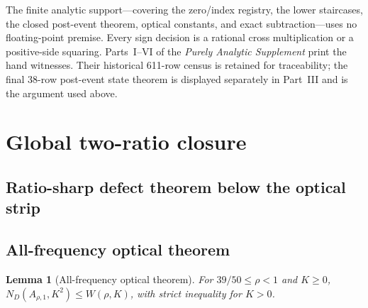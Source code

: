 \documentclass[11pt]{article}
\numberwithin{equation}{section}
\newtheorem{lemma}[theorem]{Lemma}
\theoremstyle{definition}
\theoremstyle{remark}
\begin{document}
The finite analytic support---covering the zero/index registry, the lower
staircases, the closed post-event theorem, optical constants, and exact
subtraction---uses no floating-point premise.  Every sign decision is a
rational cross multiplication or a positive-side squaring.  Parts~I--VI of
the \emph{Purely Analytic Supplement} print the hand witnesses.  Their
historical 611-row census is retained for traceability; the final
38-row post-event state theorem is displayed separately in Part~III and is
the argument used above.

\fi

\section{Global two-ratio closure}
\label{sec:global-two-owner}

\subsection{Ratio-sharp defect theorem below the optical strip}



\subsection{All-frequency optical theorem}

\begin{lemma}[All-frequency optical theorem]
\label{cm:lem-optical}
For \(39/50\leq\rho<1\) and \(K\geq0\),
\(N_D(A_{\rho,1},K^2)\leq W(\rho,K)\), with strict inequality for
\(K>0\).
\end{lemma}
\end{document}
